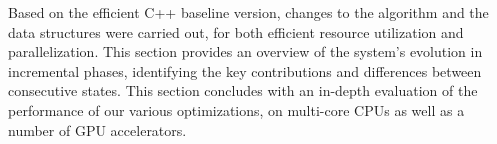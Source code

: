 
Based on the efficient C++ baseline version,
changes to the algorithm and the data structures
were carried out, for both efficient resource utilization and parallelization.
This section provides an overview of the system's evolution in incremental
phases, identifying the key contributions and differences between consecutive
states. This section concludes with an in-depth evaluation of the performance
of our various optimizations, on multi-core CPUs as well as a number of GPU
accelerators.

% 


